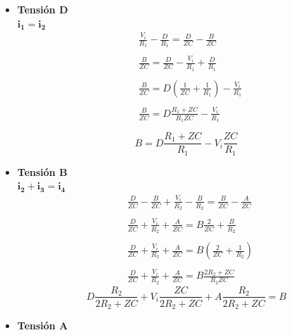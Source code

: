         \begin{itemize}
            \item \textbf{Tensión D} \\
            $\mathbf{i_{1}=i_{2}}$
            \begin{align*}
                &\frac{V_{i}}{R_{1}}-\frac{D}{R_{1}} = \frac{D}{ZC}-\frac{B}{ZC} \\\\
                &\frac{B}{ZC} = \frac{D}{ZC}- \frac{V_{i}}{R_{1}} + \frac{D}{R_{1}} \\\\
                &\frac{B}{ZC} = D(\frac{1}{ZC} +\frac{1}{R_{1}}) - \frac{V_{i}}{R_{1}} \\\\
                &\frac{B}{ZC} = D\frac{R_{1}+ZC}{R_{1}ZC} - \frac{V_{i}}{R_{1}} \\\\
            \end{align*}
            \begin{equation}\label{Nodo D}
                B = D\frac{R_{1}+ZC}{R_{1}} - V_{i}\frac{ZC}{R_{1}}
            \end{equation}
                \item \textbf{Tensión B} \\
                $ \mathbf{i_{2} + i_{3} = i_{4}}$
                \begin{align*}
                    &\frac{D}{ZC} - \frac{B}{ZC} + \frac{V_{i}}{R_{2}}-\frac{B}{R_{2}} = \frac{B}{ZC} - \frac{A}{ZC}\\\\
                    &\frac{D}{ZC}  + \frac{V_{i}}{R_{2}} + \frac{A}{ZC} = B\frac{2}{ZC}  + \frac{B}{R_{2}} \\\\
                    &\frac{D}{ZC}  + \frac{V_{i}}{R_{2}} + \frac{A}{ZC} = B(\frac{2}{ZC}  + \frac{1}{R_{2}}) \\\\
                    &\frac{D}{ZC}  + \frac{V_{i}}{R_{2}} + \frac{A}{ZC} = B\frac{2R_{2}+ZC}{R_{2}ZC}
                \end{align*}
                \begin{equation}\label{Nodo B}
                    D\frac{R_{2}}{2R_{2}+ZC}  + V_{i}\frac{ZC}{2R_{2}+ZC} + A\frac{R_{2}}{2R_{2}+ZC} = B
                \end{equation}
                \item \textbf{Tensión A} \\

\end{itemize}
